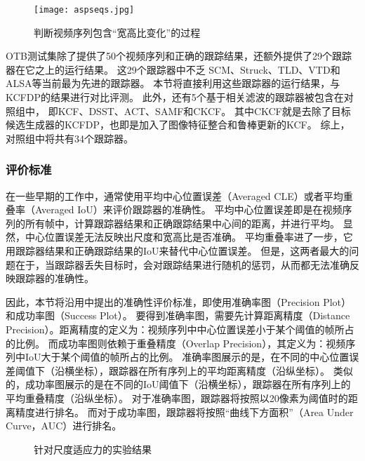 \begin{figure}[htb]
	\centering
		\texttt{[image: aspseqs.jpg]}
	\caption{判断视频序列包含``宽高比变化''的过程}
	\label{aspseqs}
\end{figure}

OTB测试集除了提供了50个视频序列和正确的跟踪结果，还额外提供了29个跟踪器在它之上的运行结果。
这29个跟踪器中不乏
SCM、Struck、TLD、VTD和ALSA等当前最为先进的跟踪器。
本节将直接利用这些跟踪器的运行结果，与KCFDP的结果进行对比评测。
此外，还有5个基于相关滤波的跟踪器被包含在对照组中，
即KCF、DSST、ACT、SAMF和CKCF。
其中CKCF就是去除了目标候选生成器的KCFDP，也即是加入了图像特征整合和鲁棒更新的KCF。
综上，对照组中将共有34个跟踪器。

\subsubsection{评价标准}
\label{evalcriteriasec}
在一些早期的工作中，通常使用平均中心位置误差（Averaged CLE）或者平均重叠率（Averaged IoU）来评价跟踪器的准确性。
平均中心位置误差即是在视频序列的所有帧中，计算跟踪器结果和正确跟踪结果中心间的距离，并进行平均。
显然，中心位置误差无法反映出尺度和宽高比是否准确。
平均重叠率进了一步，它用跟踪器结果和正确跟踪结果的IoU来替代中心位置误差。
但是，这两者最大的问题在于，当跟踪器丢失目标时，会对跟踪结果进行随机的惩罚，从而都无法准确反映跟踪器的准确性。

因此，本节将沿用\cite{50seqs}中提出的准确性评价标准，即使用准确率图（Precision Plot）和成功率图（Success Plot）。
要得到准确率图，需要先计算距离精度（Distance Precision）。距离精度的定义为：视频序列中中心位置误差小于某个阈值的帧所占的比例。
而成功率图则依赖于重叠精度（Overlap Precision），其定义为：视频序列中IoU大于某个阈值的帧所占的比例。
准确率图展示的是，在不同的中心位置误差阈值下（沿横坐标），跟踪器在所有序列上的平均距离精度（沿纵坐标）。
类似的，成功率图展示的是在不同的IoU阈值下（沿横坐标），跟踪器在所有序列上的平均重叠精度（沿纵坐标）。
对于准确率图，跟踪器将按照以20像素为阈值时的距离精度进行排名。
而对于成功率图，跟踪器将按照``曲线下方面积''（Area Under Curve，AUC）进行排名。

\begin{figure}[htb]
  \centering
  \hspace{-2.2cm}
  \newline
  \caption{针对尺度适应力的实验结果}
  \label{result1}
\end{figure}


